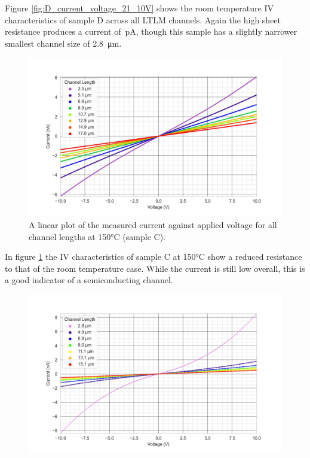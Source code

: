 \begin{refsection}
\begin{figure}[H]
\end{figure}
Figure \ref{fig:D_current_voltage_21_10V} shows the room temperature IV characteristics of sample D across all LTLM channels. Again the high sheet resistance produces a current of~\si{\pico\ampere}, though this sample has a slightly narrower smallest channel size of 2.8~\si{\micro\metre}.
\begin{figure}[H]
    \centering
    \includegraphics[width=\textwidth]{Chapter3/Figs/Raster/Sample C 2019/IV/10V IV characteristics at 150 C.jpg}
    \caption{A linear plot of the measured current against applied voltage for all channel lengths at 150\si{\degreeCelsius} (sample C).}
    \label{fig:C_current_voltage_150}
\end{figure}
In figure \ref{fig:C_current_voltage_150} the IV characteristics of sample C at 150\si{\degreeCelsius} show a reduced resistance to that of the room temperature case. While the current is still low overall, this is a good indicator of a semiconducting channel.
\begin{figure}[H]
    \centering
    \includegraphics[width=\textwidth]{Chapter3/Figs/Raster/Sample D 2019/IV/10V IV characteristics at 150 C.jpg}

\end{figure}
\end{refsection}
